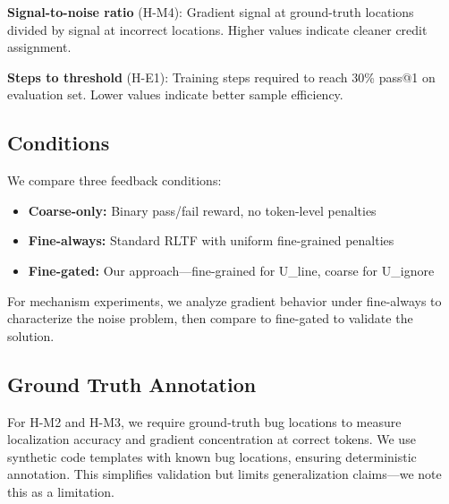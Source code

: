 \textbf{Signal-to-noise ratio} (H-M4): Gradient signal at ground-truth locations divided by signal at incorrect locations. Higher values indicate cleaner credit assignment.

\textbf{Steps to threshold} (H-E1): Training steps required to reach 30\% pass@1 on evaluation set. Lower values indicate better sample efficiency.

\subsection{Conditions}

We compare three feedback conditions:
\begin{itemize}
\item \textbf{Coarse-only:} Binary pass/fail reward, no token-level penalties
\item \textbf{Fine-always:} Standard RLTF with uniform fine-grained penalties
\item \textbf{Fine-gated:} Our approach---fine-grained for U\_line, coarse for U\_ignore
\end{itemize}

For mechanism experiments, we analyze gradient behavior under fine-always to characterize the noise problem, then compare to fine-gated to validate the solution.

\subsection{Ground Truth Annotation}

For H-M2 and H-M3, we require ground-truth bug locations to measure localization accuracy and gradient concentration at correct tokens. We use synthetic code templates with known bug locations, ensuring deterministic annotation. This simplifies validation but limits generalization claims---we note this as a limitation.
